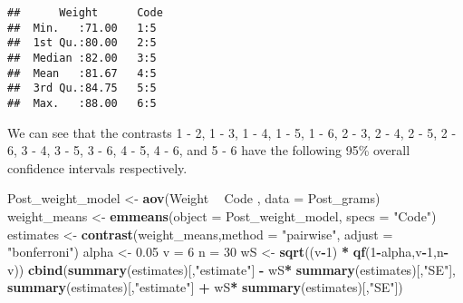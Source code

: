\documentclass[12pt,]{article}
\newenvironment{Shaded}{\begin{snugshade}}{\end{snugshade}}
\newcommand{\KeywordTok}[1]{\textcolor[rgb]{0.13,0.29,0.53}{\textbf{#1}}}
\newcommand{\DataTypeTok}[1]{\textcolor[rgb]{0.13,0.29,0.53}{#1}}
\newcommand{\DecValTok}[1]{\textcolor[rgb]{0.00,0.00,0.81}{#1}}
\newcommand{\FloatTok}[1]{\textcolor[rgb]{0.00,0.00,0.81}{#1}}
\newcommand{\StringTok}[1]{\textcolor[rgb]{0.31,0.60,0.02}{#1}}
\newcommand{\OperatorTok}[1]{\textcolor[rgb]{0.81,0.36,0.00}{\textbf{#1}}}
\newcommand{\NormalTok}[1]{#1}
\begin{document}
\begin{Shaded}
\end{Shaded}

\begin{verbatim}
##      Weight      Code 
##  Min.   :71.00   1:5  
##  1st Qu.:80.00   2:5  
##  Median :82.00   3:5  
##  Mean   :81.67   4:5  
##  3rd Qu.:84.75   5:5  
##  Max.   :88.00   6:5
\end{verbatim}

We can see that the contrasts 1 - 2, 1 - 3, 1 - 4, 1 - 5, 1 - 6, 2 - 3,
2 - 4, 2 - 5, 2 - 6, 3 - 4, 3 - 5, 3 - 6, 4 - 5, 4 - 6, and 5 - 6 have
the following 95\% overall confidence intervals respectively.

\begin{Shaded}
\begin{Highlighting}[]
\NormalTok{Post_weight_model <-}\StringTok{ }\KeywordTok{aov}\NormalTok{(Weight }\OperatorTok{~}\StringTok{ }\NormalTok{Code , }\DataTypeTok{data =}\NormalTok{ Post_grams)}
\NormalTok{weight_means <-}\StringTok{ }\KeywordTok{emmeans}\NormalTok{(}\DataTypeTok{object =}\NormalTok{ Post_weight_model, }\DataTypeTok{specs =} \StringTok{"Code"}\NormalTok{)}
\NormalTok{estimates <-}\StringTok{ }\KeywordTok{contrast}\NormalTok{(weight_means,}\DataTypeTok{method =} \StringTok{"pairwise"}\NormalTok{, }\DataTypeTok{adjust =} \StringTok{"bonferroni"}\NormalTok{)}
\NormalTok{alpha <-}\StringTok{ }\FloatTok{0.05}
\NormalTok{v =}\StringTok{ }\DecValTok{6}
\NormalTok{n =}\StringTok{ }\DecValTok{30}
\NormalTok{wS <-}\StringTok{ }\KeywordTok{sqrt}\NormalTok{((v}\OperatorTok{-}\DecValTok{1}\NormalTok{) }\OperatorTok{*}\StringTok{ }\KeywordTok{qf}\NormalTok{(}\DecValTok{1}\OperatorTok{-}\NormalTok{alpha,v}\OperatorTok{-}\DecValTok{1}\NormalTok{,n}\OperatorTok{-}\NormalTok{v))}
\KeywordTok{cbind}\NormalTok{(}\KeywordTok{summary}\NormalTok{(estimates)[,}\StringTok{"estimate"}\NormalTok{] }\OperatorTok{-}\StringTok{ }\NormalTok{wS}\OperatorTok{*}\StringTok{ }\KeywordTok{summary}\NormalTok{(estimates)[,}\StringTok{"SE"}\NormalTok{],}
      \KeywordTok{summary}\NormalTok{(estimates)[,}\StringTok{"estimate"}\NormalTok{] }\OperatorTok{+}\StringTok{ }\NormalTok{wS}\OperatorTok{*}\StringTok{ }\KeywordTok{summary}\NormalTok{(estimates)[,}\StringTok{"SE"}\NormalTok{])}
\end{Highlighting}
\end{Shaded}
\end{document}
